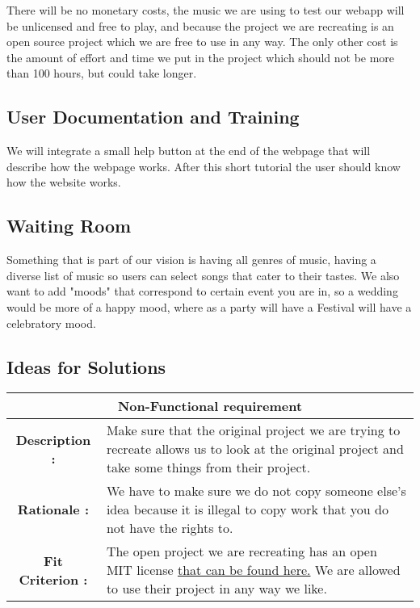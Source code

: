 \documentclass[12pt, titlepage]{article}
\begin{document}
There will be no monetary costs, the music we are using to test our webapp will be unlicensed and free to play, and because the project we are recreating is an open source project which we are free to use in any way. The only other cost is the amount of effort and time we put in the project which should not be more than 100 hours, but could take longer.

\subsection{User Documentation and Training}

We will integrate a small help button at the end of the webpage that will describe how the webpage works. After this short tutorial the user should know how the website works.

\subsection{Waiting Room}

Something that is part of our vision is having all genres of music, having a diverse list of music so users can select songs that cater to their tastes. We also want to add "moods" that correspond to certain event you are in, so a wedding would be more of a happy mood, where as a party will have a Festival will have a celebratory mood.

\subsection{Ideas for Solutions}
\begin{center}
\begin{table}[H]
\begin{tabularx}{\textwidth}{| c X |}
\hline
\multicolumn{2}{|c|}{\textbf{Non-Functional requirement}}\\
\hline
\textbf{Description : } & Make sure that the original project we are trying to recreate allows us to look at the original project and take some things from their project. \\ 
\hline 
\textbf{Rationale : } & We have to make sure we do not copy someone else's idea because it is illegal to copy work that you do not have the rights to. \\
\hline
\textbf{Fit Criterion : } & The open project we are recreating has an open MIT license \href{LICENSE.txt} {that can be found here.} We are allowed to use their project in any way we like.\\
\hline
\end{tabularx}
\end{table}
\end{center}
\end{document}
